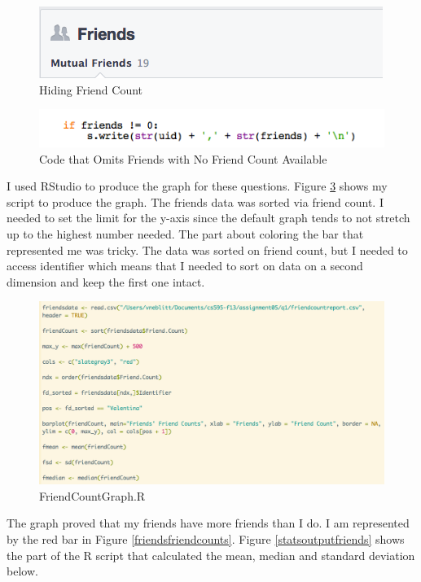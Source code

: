 \documentclass{article}
\begin{document}
\begin{figure}[H]
\centering
\includegraphics[scale=0.75]{q1/hidefriendsprofile}
\caption{Hiding Friend Count}
\label{hidefriendsprofile}
\end{figure}

\begin{figure}[H]
\centering
\includegraphics[scale=0.75]{q1/nofriendcount}
\caption{Code that Omits Friends with No Friend Count Available}
\label{nofriendcount}
\end{figure}

I used RStudio to produce the graph for these questions. Figure \ref{friendcountgraph} shows my script to produce the graph. The friends data was sorted via friend count. I needed to set the limit for the y-axis since the default graph tends to not stretch up to the highest number needed. The part about coloring the bar that represented me was tricky. The data was sorted on friend count, but I needed to access identifier which means that I needed to sort on data on a second dimension and keep the first one intact.

\begin{figure}[H]
\centering
\includegraphics[scale=0.40]{q1/rscriptFB}
\caption{FriendCountGraph.R}
\label{friendcountgraph}
\end{figure}

The graph proved that my friends have more friends than I do. I am represented by the red bar in Figure \ref{friendsfriendcounts}. Figure \ref{statsoutputfriends} shows the part of the R script that calculated the mean, median and standard deviation below.
\end{document}

